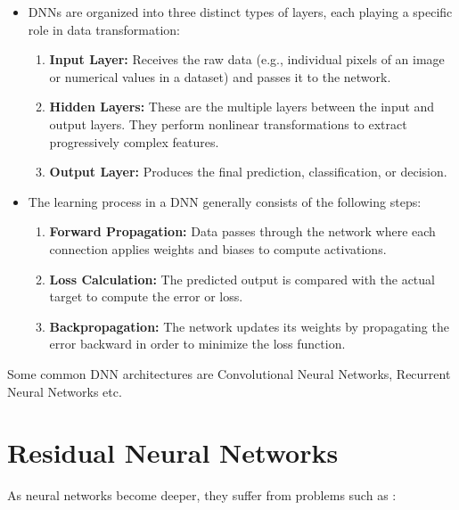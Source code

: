 \begin{itemize}

\item DNNs are organized into three distinct types of layers, each playing a specific role in data transformation:

\begin{enumerate}
    \item \textbf{Input Layer:} Receives the raw data (e.g., individual pixels of an image or numerical values in a dataset) and passes it to the network.
    
    \item \textbf{Hidden Layers:} These are the multiple layers between the input and output layers. They perform nonlinear transformations to extract progressively complex features.
    
    \item \textbf{Output Layer:} Produces the final prediction, classification, or decision.
\end{enumerate}

\item The learning process in a DNN generally consists of the following steps:

\begin{enumerate}
    \item \textbf{Forward Propagation:} Data passes through the network where each connection applies weights and biases to compute activations.
    
    \item \textbf{Loss Calculation:} The predicted output is compared with the actual target to compute the error or loss.
    
    \item \textbf{Backpropagation:} The network updates its weights by propagating the error backward in order to minimize the loss function.
\end{enumerate}

\end{itemize}

Some common DNN architectures are Convolutional Neural Networks, Recurrent Neural Networks etc.



\section{Residual Neural Networks}

As neural networks become deeper, they suffer from problems such as :

